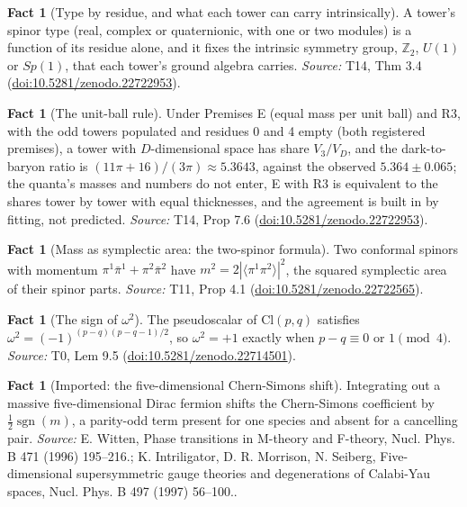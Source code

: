 \documentclass[11pt]{article}
\theoremstyle{definition}
\newtheorem{fact}[theorem]{Fact}
\theoremstyle{plain}
\providecommand{\Cl}{}\renewcommand{\Cl}{\mathrm{Cl}}
\providecommand{\Z}{}\renewcommand{\Z}{\mathbb{Z}}
\providecommand{\sgn}{}\renewcommand{\sgn}{\operatorname{sgn}}
\providecommand{\br}{}\renewcommand{\br}[1]{\langle #1\rangle}
\begin{document}
\begin{fact}[Type by residue, and what each tower can carry intrinsically]\label{c:dark-matter.type-residue-what-each-tower-can}
A tower's spinor type (real, complex or quaternionic, with one or two modules) is a function of its residue alone, and it fixes the intrinsic symmetry group, $\Z_{2}$, $U(1)$ or $Sp(1)$, that each tower's ground algebra carries.
\emph{Source:} T14, Thm 3.4 (\href{https://doi.org/10.5281/zenodo.22722953}{doi:10.5281/zenodo.22722953}).
\end{fact}

\begin{fact}[The unit-ball rule]\label{c:dark-matter.unit-ball-rule}
Under Premises E (equal mass per unit ball) and R3, with the odd towers populated and residues 0 and 4 empty (both registered premises), a tower with $D$-dimensional space has share $V_{3}/V_{D}$, and the dark-to-baryon ratio is $(11\pi + 16)/(3\pi) \approx 5.3643$, against the observed $5.364 \pm 0.065$; the quanta's masses and numbers do not enter, E with R3 is equivalent to the shares tower by tower with equal thicknesses, and the agreement is built in by fitting, not predicted.
\emph{Source:} T14, Prop 7.6 (\href{https://doi.org/10.5281/zenodo.22722953}{doi:10.5281/zenodo.22722953}).
\end{fact}

\begin{fact}[Mass as symplectic area: the two-spinor formula]\label{c:mass.mass-symplectic-area-two-twistor-formula}
Two conformal spinors with momentum $\pi^{1}\bar\pi^{1} + \pi^{2}\bar\pi^{2}$ have $m^{2} = 2|\br{\pi^{1}\pi^{2}}|^{2}$, the squared symplectic area of their spinor parts.
\emph{Source:} T11, Prop 4.1 (\href{https://doi.org/10.5281/zenodo.22722565}{doi:10.5281/zenodo.22722565}).
\end{fact}

\begin{fact}[The sign of $\omega^2$]\label{c:primer.sign}
The pseudoscalar of $\Cl(p,q)$ satisfies $\omega^{2} = (-1)^{(p-q)(p-q-1)/2}$, so $\omega^{2} = +1$ exactly when $p - q \equiv 0$ or $1 \pmod 4$.
\emph{Source:} T0, Lem 9.5 (\href{https://doi.org/10.5281/zenodo.22714501}{doi:10.5281/zenodo.22714501}).
\end{fact}

\begin{fact}[Imported: the five-dimensional Chern-Simons shift]\label{c:rule2.imported-five-dimensional-chern-simons-shift}
Integrating out a massive five-dimensional Dirac fermion shifts the Chern-Simons coefficient by $\tfrac12\sgn(m)$, a parity-odd term present for one species and absent for a cancelling pair.
\emph{Source:} E. Witten, Phase transitions in M-theory and F-theory, Nucl. Phys. B 471 (1996) 195--216.; K. Intriligator, D. R. Morrison, N. Seiberg, Five-dimensional supersymmetric gauge theories and degenerations of Calabi-Yau spaces, Nucl. Phys. B 497 (1997) 56--100..
\end{fact}
\end{document}
